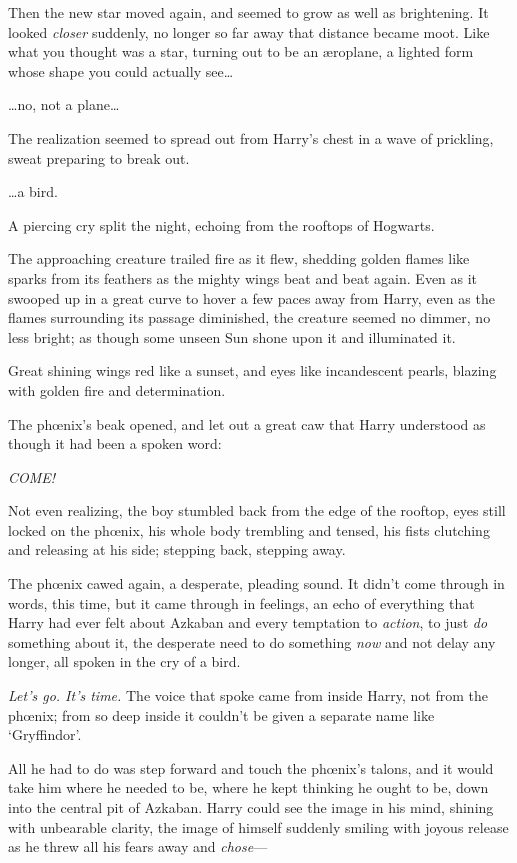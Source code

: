 Then the new star moved again, and seemed to grow as well as brightening. It looked \emph{closer} suddenly, no longer so far away that distance became moot. Like what you thought was a star, turning out to be an æroplane, a lighted form whose shape you could actually see{\ldots}

{\ldots}no, not a plane{\ldots}

The realization seemed to spread out from Harry's chest in a wave of prickling, sweat preparing to break out.

{\ldots}a bird.

A piercing cry split the night, echoing from the rooftops of Hogwarts.

The approaching creature trailed fire as it flew, shedding golden flames like sparks from its feathers as the mighty wings beat and beat again. Even as it swooped up in a great curve to hover a few paces away from Harry, even as the flames surrounding its passage diminished, the creature seemed no dimmer, no less bright; as though some unseen Sun shone upon it and illuminated it.

Great shining wings red like a sunset, and eyes like incandescent pearls, blazing with golden fire and determination.

The phœnix's beak opened, and let out a great caw that Harry understood as though it had been a spoken word:

\emph{COME!}

Not even realizing, the boy stumbled back from the edge of the rooftop, eyes still locked on the phœnix, his whole body trembling and tensed, his fists clutching and releasing at his side; stepping back, stepping away.

The phœnix cawed again, a desperate, pleading sound. It didn't come through in words, this time, but it came through in feelings, an echo of everything that Harry had ever felt about Azkaban and every temptation to \emph{action}, to just \emph{do} something about it, the desperate need to do something \emph{now} and not delay any longer, all spoken in the cry of a bird.

\emph{Let's go. It's time.} The voice that spoke came from inside Harry, not from the phœnix; from so deep inside it couldn't be given a separate name like `Gryffindor'.

All he had to do was step forward and touch the phœnix's talons, and it would take him where he needed to be, where he kept thinking he ought to be, down into the central pit of Azkaban. Harry could see the image in his mind, shining with unbearable clarity, the image of himself suddenly smiling with joyous release as he threw all his fears away and \emph{chose}---

